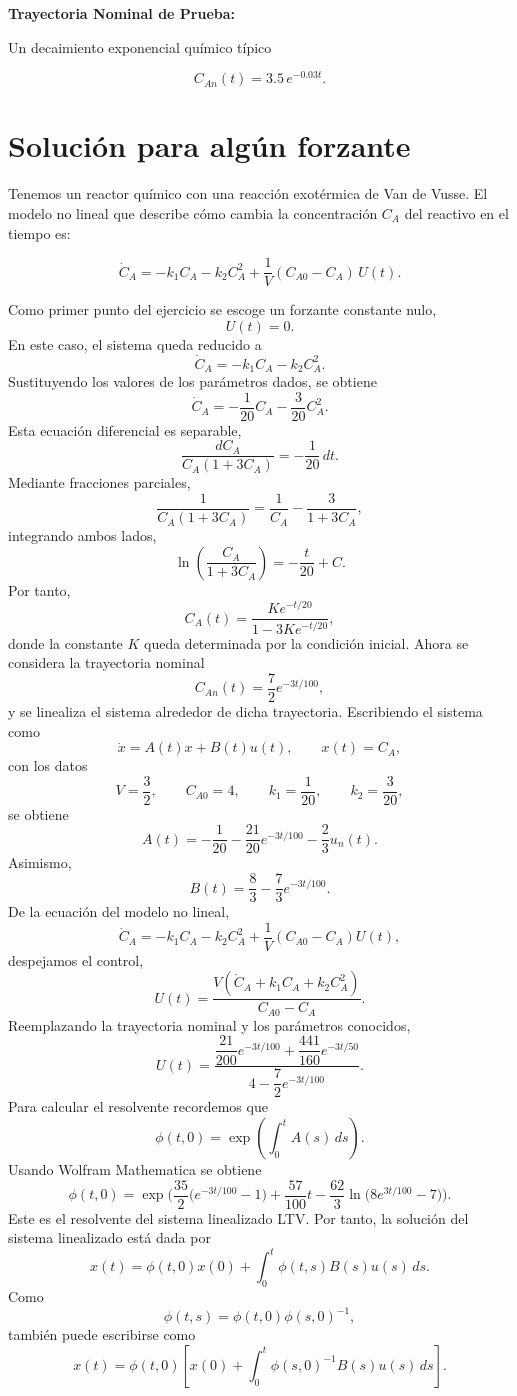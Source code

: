 \documentclass{uofa-eng-assignment}
\begin{document}
\vspace{0.4cm}

\textbf{\large Trayectoria Nominal de Prueba:}

Un decaimiento exponencial químico típico

\begin{equation}
C_{An}(t)=3.5\,e^{-0.03t}.
\end{equation}
\section*{Solución para algún forzante}

Tenemos un reactor químico con una reacción exotérmica de Van de Vusse. El modelo no lineal que describe cómo cambia la concentración $C_A$ del reactivo en el tiempo es:

\begin{equation}
\dot{C}_A
=
-k_1 C_A
-k_2 C_A^2
+\frac{1}{V}(C_{A0}-C_A)\,U(t).
\label{eq}
\end{equation}

Como primer punto del ejercicio se escoge un forzante constante nulo,
\[
U(t)=0.
\]
En este caso, el sistema queda reducido a
\[
\dot C_A
=
-k_1C_A-k_2C_A^2.
\]
Sustituyendo los valores de los parámetros dados, se obtiene
\[
\dot C_A
=
-\frac1{20}C_A
-\frac3{20}C_A^2.
\]
Esta ecuación diferencial es separable,
\[
\frac{dC_A}
{C_A(1+3C_A)}
=
-\frac1{20}\,dt.
\]
Mediante fracciones parciales,
\[
\frac1{C_A(1+3C_A)}
=
\frac1{C_A}
-
\frac3{1+3C_A},
\]
integrando ambos lados,
\[
\ln\left(
\frac{C_A}{1+3C_A}
\right)
=
-\frac{t}{20}+C.
\]
Por tanto,
\[
\boxed{
C_A(t)
=
\frac{Ke^{-t/20}}
{1-3Ke^{-t/20}},
}
\]
donde la constante $K$ queda determinada por la condición inicial.
\vspace{0.4cm}
Ahora se considera la trayectoria nominal
\[
C_{An}(t)=\frac72e^{-3t/100},
\]
y se linealiza el sistema alrededor de dicha trayectoria.
Escribiendo el sistema como
\[
\dot{x}=A(t)x+B(t)u(t),
\qquad
x(t)=C_A,
\]
con los datos
\[
V=\frac32,\qquad
C_{A0}=4,\qquad
k_1=\frac1{20},\qquad
k_2=\frac3{20},
\]
se obtiene
\[
A(t)
=
-\frac1{20}
-\frac{21}{20}e^{-3t/100}
-\frac23u_n(t).
\]
Asimismo,
\[
B(t)
=
\frac83
-\frac73e^{-3t/100}.
\]
De la ecuación del modelo no lineal,
\[
\dot C_A
=
-k_1C_A
-k_2C_A^2
+\frac1V(C_{A0}-C_A)U(t),
\]
despejamos el control,
\[
U(t)
=
\frac{V\left(\dot C_A+k_1C_A+k_2C_A^2\right)}
{C_{A0}-C_A}.
\]
Reemplazando la trayectoria nominal y los parámetros conocidos,
\[
U(t)
=
\frac{
\dfrac{21}{200}e^{-3t/100}
+
\dfrac{441}{160}e^{-3t/50}
}
{
4-\dfrac72e^{-3t/100}
}.
\]
Para calcular el resolvente recordemos que
\[
\phi(t,0)
=
\exp\left(
\int_0^tA(s)\,ds
\right).
\]
Usando Wolfram Mathematica se obtiene
\[
\phi(t,0)=
\exp\!\Big(
\frac{35}{2}\big(e^{-3t/100}-1\big)
+\frac{57}{100}t
-\frac{62}{3}\ln\big(8e^{3t/100}-7\big)
\Big).
\]
Este es el resolvente del sistema linealizado LTV. Por tanto, la solución del sistema linealizado está dada por
\[
x(t)
=
\phi(t,0)x(0)
+
\int_0^t
\phi(t,s)B(s)u(s)\,ds.
\]
Como
\[
\phi(t,s)=\phi(t,0)\phi(s,0)^{-1},
\]
también puede escribirse como
\[
x(t)
=
\phi(t,0)
\left[
x(0)
+
\int_0^t
\phi(s,0)^{-1}B(s)u(s)\,ds
\right].
\]
\end{document}
